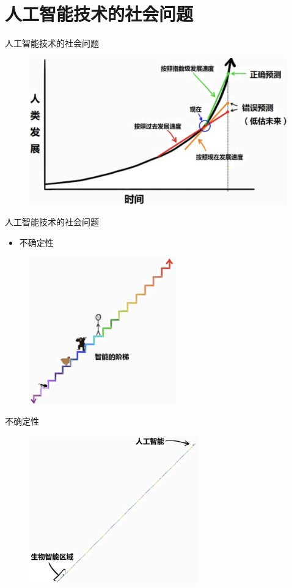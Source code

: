 \documentclass{beamer}
\begin{document}
\section{人工智能技术的社会问题}
  \begin{frame}{人工智能技术的社会问题}
   \begin{figure}[H]
   \centering
   \includegraphics[height=2.5in]{zsjPic1.jpg}
   \end{figure}
  \end{frame} 

\begin{frame}{人工智能技术的社会问题}
  \begin{itemize}
   \item 不确定性
  \end{itemize}

  \begin{figure}[H]
   \centering
   \includegraphics[height=2.5in]{zsjPic2.jpg}
   \end{figure}
\end{frame} 

\begin{frame}{不确定性}
  \begin{figure}[H]
   \centering
   \includegraphics[height=2.5in]{zsjPic3.jpg}
   \end{figure}
\end{frame} 
\end{document}
